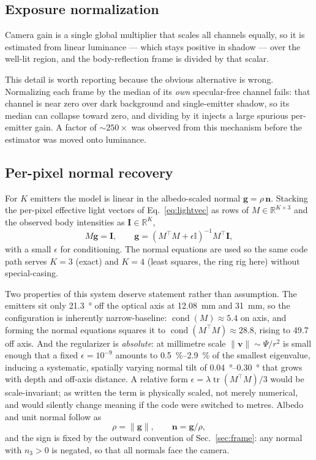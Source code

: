 \documentclass[journal,10pt]{IEEEtran}
\newcommand{\vecn}{\bm{n}}
\newcommand{\vecg}{\bm{g}}
\begin{document}
\subsection{Exposure normalization}\label{sec:exposure}
Camera gain is a single global multiplier that scales all channels equally, so
it is estimated from linear luminance --- which stays positive in shadow --- over
the well-lit region, and the body-reflection frame is divided by that scalar.

This detail is worth reporting because the obvious alternative is wrong.
Normalizing each frame by the median of its \emph{own} specular-free channel
fails: that channel is near zero over dark background and single-emitter shadow,
so its median can collapse toward zero, and dividing by it injects a large
spurious per-emitter gain. A factor of ${\sim}250\times$ was observed from this
mechanism before the estimator was moved onto luminance.

\subsection{Per-pixel normal recovery}
For $K$ emitters the model is linear in the albedo-scaled normal
$\vecg = \rho\,\vecn$. Stacking the per-pixel effective light vectors of
Eq.~\eqref{eq:lightvec} as rows of $M \in \mathbb{R}^{K\times3}$ and the
observed body intensities as $\bm{I}\in\mathbb{R}^{K}$,
\begin{equation}
M\vecg = \bm{I},
\qquad
\vecg = (M^{\!\top}\!M + \epsilon \mathbb{I})^{-1} M^{\!\top}\bm{I},
\label{eq:normalsolve}
\end{equation}
with a small $\epsilon$ for conditioning. The normal equations are used so the
same code path serves $K=3$ (exact) and $K=4$ (least squares, the ring rig here)
without special-casing.

Two properties of this system deserve statement rather than assumption. The
emitters sit only \SI{21.3}{\degree} off the optical axis at
\SI{12.08}{\milli\metre} and \SI{31}{\milli\metre}, so the configuration is
inherently narrow-baseline: $\operatorname{cond}(M)\approx5.4$ on axis, and
forming the normal equations squares it to
$\operatorname{cond}(M^{\!\top}\!M)\approx28.8$, rising to \num{49.7} off axis.
And the regularizer is \emph{absolute}: at millimetre scale
$\lVert\bm{v}\rVert\sim\Psi/r^2$ is small enough that a fixed
$\epsilon=10^{-9}$ amounts to \SIrange{0.5}{2.9}{\percent} of the smallest
eigenvalue, inducing a systematic, spatially varying normal tilt of
\SIrange{0.04}{0.30}{\degree} that grows with depth and off-axis distance. A
relative form $\epsilon = \lambda\operatorname{tr}(M^{\!\top}\!M)/3$ would be
scale-invariant; as written the term is physically scaled, not merely numerical,
and would silently change meaning if the code were switched to metres. Albedo
and unit normal follow as
\begin{equation}
\rho = \lVert\vecg\rVert, \qquad \vecn = \vecg/\rho ,
\end{equation}
and the sign is fixed by the outward convention of Sec.~\ref{sec:frame}: any
normal with $n_3 > 0$ is negated, so that all normals face the camera.
\end{document}
